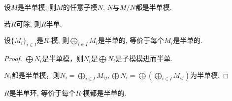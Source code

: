 \begin{proposition}
    设$M$是半单模, 则$M$的任意子模$N$, $N$与$M/N$都是半单模.
\end{proposition}

\begin{proposition}
    若$R$可除, 则$R$半单.
\end{proposition}

\begin{proposition}
    设$\{M_i\}_{i\in I}$是$R$-模, 则$\bigoplus\limits_{i\in I} M_i$是半单的, 
    等价于每个$M_i$是半单的.
\end{proposition}
\begin{proof}
$\bigoplus N_i$是半单模，则$N_i$是$\bigoplus N_i$是子模模进而半单.

$N_i$都是半单模，则$N_i=\bigoplus\limits_{i\in I}M_{ij},
\bigoplus N_i=\bigoplus(\bigoplus\limits_{i\in I}M_{ij})$为半单模.
\end{proof}
\begin{proposition}
    $R$是半单环, 等价于每个$R$-模都是半单的.
\end{proposition}

